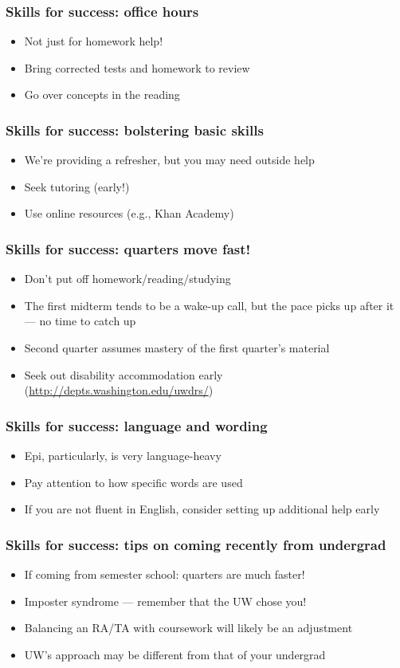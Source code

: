 \documentclass[12pt]{beamer}
\newcommand{\myframe}[1]{\begin{frame} \frametitle{#1}}
\newenvironment{spaceitemize}
{ \begin{itemize}
    \setlength{\itemsep}{10pt}
    \setlength{\parskip}{0pt}
    \setlength{\parsep}{0pt}     }
{ \end{itemize}                  }
\begin{document}
\myframe{Skills for success: office hours}
\begin{spaceitemize}
\item Not just for homework help!
\item Bring corrected tests and homework to review
\item Go over concepts in the reading
\end{spaceitemize}
\end{frame}

\myframe{Skills for success: bolstering basic skills}
\begin{spaceitemize}
\item We're providing a refresher, but you may need outside help
\item Seek tutoring (early!)
\item Use online resources (e.g., Khan Academy)
\end{spaceitemize}
\end{frame}

\myframe{Skills for success: quarters move fast!}
\begin{spaceitemize}
\item Don't put off homework/reading/studying
\item The first midterm tends to be a wake-up call, but the pace picks up after it --- no time to catch up
\item Second quarter assumes mastery of the first quarter's material
\item Seek out disability accommodation early (\url{http://depts.washington.edu/uwdrs/})
\end{spaceitemize}
\end{frame}

\myframe{Skills for success: language and wording}
\begin{spaceitemize}
\item Epi, particularly, is very language-heavy
\item Pay attention to how specific words are used
\item If you are not fluent in English, consider setting up additional help early
\end{spaceitemize}
\end{frame}

\myframe{Skills for success: tips on coming recently from undergrad}
\begin{spaceitemize}
\item If coming from semester school: quarters are much faster!
\item Imposter syndrome --- remember that the UW chose you!
\item Balancing an RA/TA with coursework will likely be an adjustment
\item UW's approach may be different from that of your undergrad
\end{spaceitemize}
\end{frame}
\end{document}
